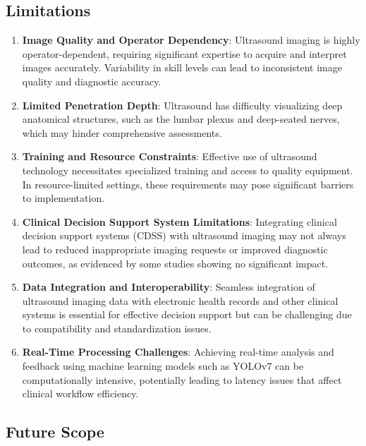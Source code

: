 \documentclass[12pt]{article}
\begin{document}
\subsection{Limitations}
\begin{enumerate}
    \item[\textbf{1.}] \textbf{Image Quality and Operator Dependency}: Ultrasound imaging is highly operator-dependent, requiring significant expertise to acquire and interpret images accurately. Variability in skill levels can lead to inconsistent image quality and diagnostic accuracy.
    
    \item[\textbf{2.}] \textbf{Limited Penetration Depth}: Ultrasound has difficulty visualizing deep anatomical structures, such as the lumbar plexus and deep-seated nerves, which may hinder comprehensive assessments.
    
    \item[\textbf{3.}] \textbf{Training and Resource Constraints}: Effective use of ultrasound technology necessitates specialized training and access to quality equipment. In resource-limited settings, these requirements may pose significant barriers to implementation.
    
    \item[\textbf{4.}] \textbf{Clinical Decision Support System Limitations}: Integrating clinical decision support systems (CDSS) with ultrasound imaging may not always lead to reduced inappropriate imaging requests or improved diagnostic outcomes, as evidenced by some studies showing no significant impact.
    
    \item[\textbf{5.}] \textbf{Data Integration and Interoperability}: Seamless integration of ultrasound imaging data with electronic health records and other clinical systems is essential for effective decision support but can be challenging due to compatibility and standardization issues.
    
    \item[\textbf{6.}] \textbf{Real-Time Processing Challenges}: Achieving real-time analysis and feedback using machine learning models such as YOLOv7 can be computationally intensive, potentially leading to latency issues that affect clinical workflow efficiency.
\end{enumerate}


\newpage
\subsection{Future Scope}
\end{document}

